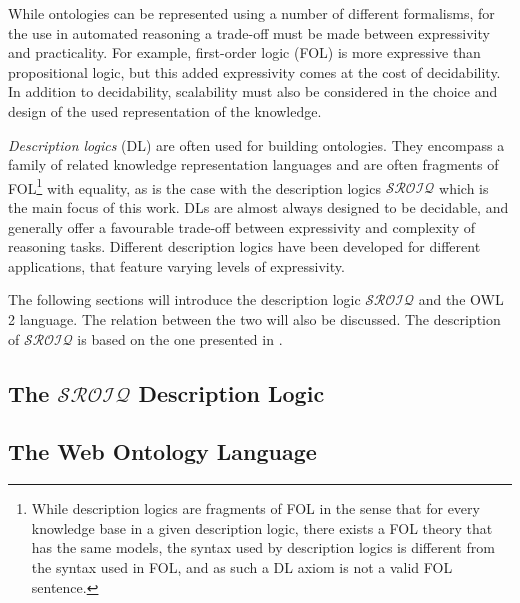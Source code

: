 
While ontologies can be represented using a number of different formalisms, for the use in automated reasoning a trade-off must be made between expressivity and practicality. For example, first-order logic (FOL) is more expressive than propositional logic, but this added expressivity comes at the cost of decidability. In addition to decidability, scalability must also be considered in the choice and design of the used representation of the knowledge.

\emph{Description logics} (DL) are often used for building ontologies. They encompass a family of related knowledge representation languages and are often fragments of FOL\footnote{While description logics are fragments of FOL in the sense that for every knowledge base in a given description logic, there exists a FOL theory that has the same models, the syntax used by description logics is different from the syntax used in FOL, and as such a DL axiom is not a valid FOL sentence.} with equality, as is the case with the description logics $\mathcal{SROIQ}$ which is the main focus of this work. DLs are almost always designed to be decidable, and generally offer a favourable trade-off between expressivity and complexity of reasoning tasks. Different description logics have been developed for different applications, that feature varying levels of expressivity.

The following sections will introduce the description logic $\mathcal{SROIQ}$ and the OWL 2 language. The relation between the two will also be discussed. The description of $\mathcal{SROIQ}$ is based on the one presented in \cite{rudolph2011foundations}.

\subsection{The \texorpdfstring{$\mathcal{SROIQ}$}{SROIQ} Description Logic} \label{sroiq-def}



\subsection{The Web Ontology Language} \label{owl-def}


